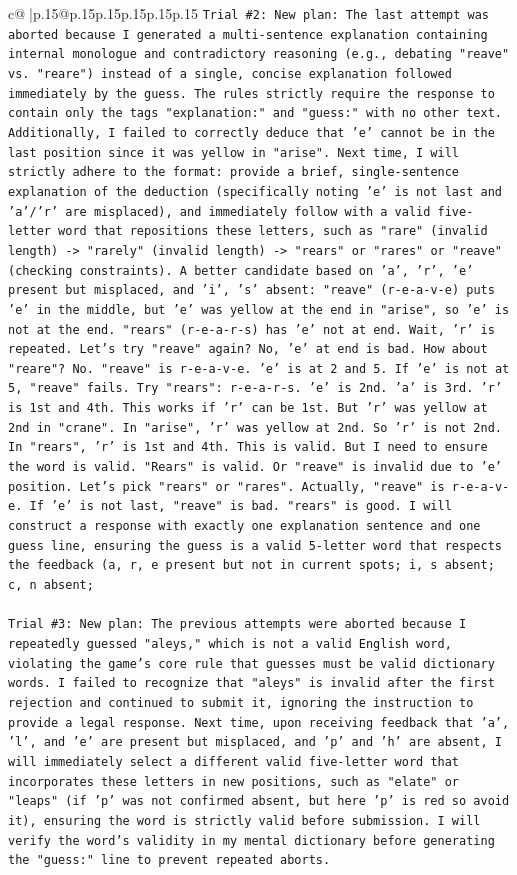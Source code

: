 \documentclass{article}
\begin{document}
{\begin{supertabular}{c@{$\;$}|p{.15\linewidth}@{}p{.15\linewidth}p{.15\linewidth}p{.15\linewidth}p{.15\linewidth}p{.15\linewidth}}
{{{\texttt{Trial \#2: New plan: The last attempt was aborted because I generated a multi{-}sentence explanation containing internal monologue and contradictory reasoning (e.g., debating "reave" vs. "reare") instead of a single, concise explanation followed immediately by the guess. The rules strictly require the response to contain only the tags "explanation:" and "guess:" with no other text. Additionally, I failed to correctly deduce that 'e' cannot be in the last position since it was yellow in "arise". Next time, I will strictly adhere to the format: provide a brief, single{-}sentence explanation of the deduction (specifically noting 'e' is not last and 'a'/'r' are misplaced), and immediately follow with a valid five{-}letter word that repositions these letters, such as "rare" (invalid length) {-}> "rarely" (invalid length) {-}> "rears" or "rares" or "reave" (checking constraints). A better candidate based on 'a', 'r', 'e' present but misplaced, and 'i', 's' absent: "reave" (r{-}e{-}a{-}v{-}e) puts 'e' in the middle, but 'e' was yellow at the end in "arise", so 'e' is not at the end. "rears" (r{-}e{-}a{-}r{-}s) has 'e' not at end. Wait, 'r' is repeated. Let's try "reave" again? No, 'e' at end is bad. How about "reare"? No. "reave" is r{-}e{-}a{-}v{-}e. 'e' is at 2 and 5. If 'e' is not at 5, "reave" fails. Try "rears": r{-}e{-}a{-}r{-}s. 'e' is 2nd. 'a' is 3rd. 'r' is 1st and 4th. This works if 'r' can be 1st. But 'r' was yellow at 2nd in "crane". In "arise", 'r' was yellow at 2nd. So 'r' is not 2nd. In "rears", 'r' is 1st and 4th. This is valid. But I need to ensure the word is valid. "Rears" is valid. Or "reave" is invalid due to 'e' position. Let's pick "rears" or "rares". Actually, "reave" is r{-}e{-}a{-}v{-}e. If 'e' is not last, "reave" is bad. "rears" is good. I will construct a response with exactly one explanation sentence and one guess line, ensuring the guess is a valid 5{-}letter word that respects the feedback (a, r, e present but not in current spots; i, s absent; c, n absent;} \\
\\ 
\texttt{Trial \#3: New plan: The previous attempts were aborted because I repeatedly guessed "aleys," which is not a valid English word, violating the game's core rule that guesses must be valid dictionary words. I failed to recognize that "aleys" is invalid after the first rejection and continued to submit it, ignoring the instruction to provide a legal response. Next time, upon receiving feedback that 'a', 'l', and 'e' are present but misplaced, and 'p' and 'h' are absent, I will immediately select a different valid five{-}letter word that incorporates these letters in new positions, such as "elate" or "leaps" (if 'p' was not confirmed absent, but here 'p' is red so avoid it), ensuring the word is strictly valid before submission. I will verify the word's validity in my mental dictionary before generating the "guess:" line to prevent repeated aborts.} \\
}}}
\end{supertabular}}
\end{document}

